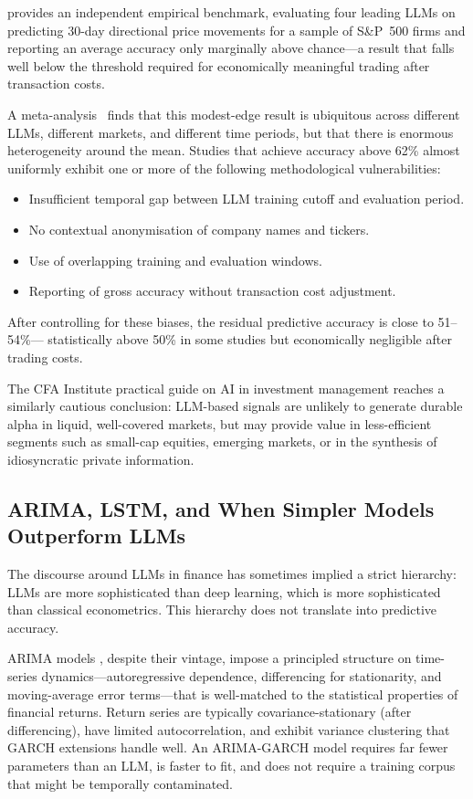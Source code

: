 \citet{VidalSSRN2024} provides an independent empirical benchmark, evaluating four
leading LLMs on predicting 30-day directional price movements for a sample of S\&P~500
firms and reporting an average accuracy only marginally above chance---a result that
falls well below the threshold required for economically
meaningful trading after transaction costs.

A meta-analysis~\cite{zhao2025frontiers} finds that this modest-edge result is
ubiquitous across different LLMs, different markets, and
different time periods, but that there is enormous heterogeneity around the mean.
Studies that achieve accuracy above 62\% almost uniformly exhibit one or more of the
following methodological vulnerabilities:
\begin{itemize}
  \item Insufficient temporal gap between LLM training cutoff and evaluation period.
  \item No contextual anonymisation of company names and tickers.
  \item Use of overlapping training and evaluation windows.
  \item Reporting of gross accuracy without transaction cost adjustment.
\end{itemize}

After controlling for these biases, the residual predictive accuracy is close to 51--54\%---
statistically above 50\% in some studies but economically negligible after trading costs.

The CFA Institute practical guide on AI in investment management \cite{cfa2025llmguide}
reaches a similarly cautious conclusion: LLM-based signals are unlikely to generate
durable alpha in liquid, well-covered markets, but may provide value in less-efficient
segments such as small-cap equities, emerging markets, or in the synthesis of
idiosyncratic private information.

\subsection{ARIMA, LSTM, and When Simpler Models Outperform LLMs}
\label{sec:ch13-arima-lstm-simpler-models}

The discourse around LLMs in finance has sometimes implied a strict hierarchy: LLMs
are more sophisticated than deep learning, which is more sophisticated than classical
econometrics. This hierarchy does not translate into predictive accuracy.

ARIMA models \cite{box1970distribution}, despite their vintage, impose a principled
structure on time-series dynamics---autoregressive dependence, differencing for
stationarity, and moving-average error terms---that is well-matched to the statistical
properties of financial returns. Return series are typically covariance-stationary (after
differencing), have limited autocorrelation, and exhibit variance clustering that
GARCH extensions handle well. An ARIMA-GARCH model requires far fewer parameters than
an LLM, is faster to fit, and does not require a training corpus that might be
temporally contaminated.

